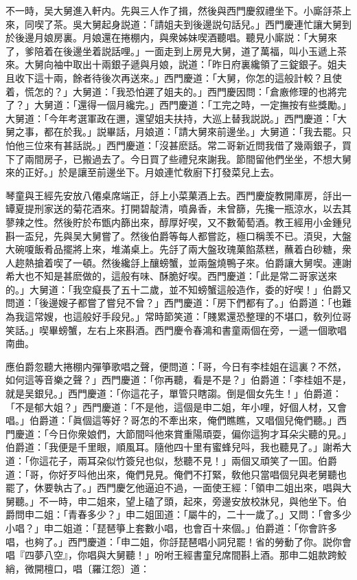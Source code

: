 不一時，吴大舅進入軒内。先與三人作了揖，然後與西門慶叙禮坐下。小廝㧱茶上來，同喫了茶。吳大舅起身説道：「請姐夫到後邊説句話兒。」西門慶連忙讓大舅到於後邊月娘房裏。月娘還在捲棚内，與衆姊妹喫酒聽唱。聽見小廝説：「大舅來了，爹陪着在後邊坐着説話哩。」一面走到上房見大舅，道了萬福，叫小玉遞上茶來。大舅向袖中取出十兩銀子遞與月娘，説道：「昨日府裏纔領了三錠銀子。姐夫且收下這十兩，餘者待後次再送來。」西門慶道：「大舅，你怎的這般計較？且使着，慌怎的？」大舅道：「我恐怕遲了姐夫的。」西門慶因問：「倉廒修理的也將完了？」大舅道：「還得一個月纔完。」西門慶道：「工完之時，一定撫按有些獎勵。」大舅道：「今年考選軍政在邇，還望姐夫扶持，大巡上替我説説。」西門慶道：「大舅之事，都在於我。」説畢話，月娘道：「請大舅來前邊坐。」大舅道：「我去罷。只怕他三位來有甚話説。」西門慶道：「沒甚麽話。常二哥新近問我借了幾兩銀子，買下了兩間房子，已搬過去了。今日買了些禮兒來謝我。節間留他們坐坐，不想大舅來的正好。」於是讓至前邊坐下。月娘連忙敎廚下打發菜兒上去。

琴童與王經先安放八僊桌席端正，㧱上小菜菓酒上去。西門慶旋教開庫房，㧱出一罈夏提刑家送的菊花酒來。打開碧靛清，噴鼻香，未曾篩，先攙一瓶涼水，以去其蓼辣之性。然後貯於布甑内篩出來，醇厚好喫，又不數葡萄酒。教王經用小金鍾兒斟一盃兒，先與吴大舅嘗了。然後伯爵等每人都嘗訖，極口稱羡不已。湏臾，大盤大碗嗄飯肴品擺將上來，堆滿桌上。先㧱了兩大盤玫瑰菓餡蒸糕，蘸着白砂糖，衆人趂熱搶着喫了一頓。然後纔㧱上釀螃蟹，並兩盤燒鴨子來。伯爵讓大舅喫。連謝希大也不知是甚麽做的，這般有味、酥脆好喫。西門慶道：「此是常二哥家送來的。」大舅道：「我空癡長了五十二歲，並不知螃蟹這般造作，委的好喫！」伯爵又問道：「後邊嫂子都嘗了嘗兒不曾？」西門慶道：「房下們都有了。」伯爵道：「也難為我這常嫂，也這般好手段兒。」常時節笑道：「賤累還恐整理的不堪口，敎列位哥笑話。」喫畢螃蟹，左右上來斟酒。西門慶令春鴻和書童兩個在旁，一遞一個歌唱南曲。

應伯爵忽聽大捲棚内彈箏歌唱之聲，便問道：「哥，今日有李桂姐在這裏？不然，如何這等音樂之聲？」西門慶道：「你再聽，看是不是？」伯爵道：「李桂姐不是，就是吴銀兒。」西門慶道：「你這花子，單管只瞎謅。倒是個女先生！」伯爵道：「不是郁大姐？」西門慶道：「不是他，這個是申二姐，年小哩，好個人材，又會唱。」伯爵道：「眞個這等好？哥怎的不牽出來，俺們瞧瞧，又唱個兒俺們聽。」西門慶道：「今日你衆娘們，大節間呌他來賞重陽頑耍，偏你這狗才耳朵尖聽的見。」伯爵道：「我便是千里眼，順風耳。隨他四十里有蜜蜂兒呌，我也聽見了。」謝希大道：「你這花子，兩耳朶似竹簽兒也似，愁聽不見！」兩個又頑笑了一囬。伯爵道：「哥，你好歹呌他出來，俺們見見。俺們不打緊，敎他只當唱個兒與老舅聽也罷了，休要執古了。」西門慶乞他逼迫不過，一面使王經：「領申二姐出來，唱與大舅聽。」不一時，申二姐來，望上磕了頭，起來，旁邊安放校牀兒，與他坐下。伯爵問申二姐：「青春多少？」申二姐囬道：「屬牛的，二十一歲了。」又問：「會多少小唱？」申二姐道：「琵琶箏上套數小唱，也會百十來個。」伯爵道：「你會許多唱，也夠了。」西門慶道：「申二姐，你㧱琵琶唱小詞兒罷！省的勞動了你。説你會唱『四夢八空』，你唱與大舅聽！」吩咐王經書童兒席間斟上酒。那申二姐款跨鮫綃，微開檀口，唱〔羅江怨〕道：

